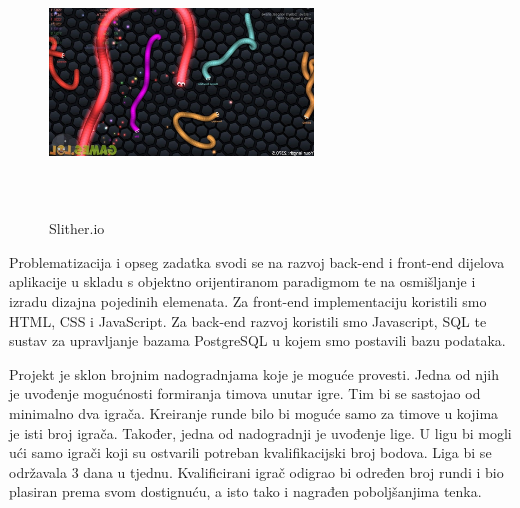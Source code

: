 \begin{figure}[h]
	\centering
	\includegraphics[width=7cm,height=7cm]{ioExample}
	\caption{Slither.io}
	\label{fig:opis}
\end{figure}

Problematizacija i opseg zadatka svodi se na razvoj back-end i front-end dijelova aplikacije u skladu s objektno orijentiranom paradigmom te na osmišljanje i izradu dizajna pojedinih elemenata. Za front-end implementaciju koristili smo HTML, CSS i JavaScript. Za back-end razvoj koristili smo Javascript, SQL te sustav za upravljanje bazama PostgreSQL u kojem smo postavili bazu podataka.

Projekt je sklon brojnim nadogradnjama koje je moguće provesti. Jedna od njih je uvođenje mogućnosti formiranja timova unutar igre. Tim bi se sastojao od minimalno dva igrača. Kreiranje runde bilo bi moguće samo za timove u kojima je isti broj igrača. Također, jedna od nadogradnji je uvođenje lige. U ligu bi mogli ući samo igrači koji su ostvarili potreban kvalifikacijski broj bodova. Liga bi se održavala 3 dana u tjednu. Kvalificirani igrač odigrao bi određen broj rundi i bio plasiran prema svom dostignuću, a isto tako i nagrađen poboljšanjima tenka.\\
 		
	